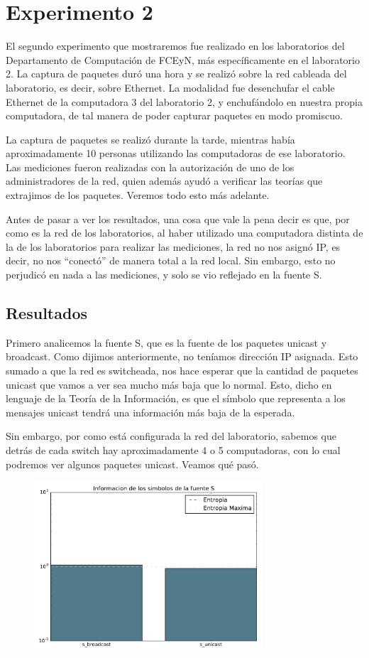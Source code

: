 \section{Experimento 2}

\PARstart El segundo experimento que mostraremos fue realizado en los laboratorios del Departamento de Computación de FCEyN, más específicamente en el laboratorio 2.
La captura de paquetes duró una hora y se realizó sobre la red cableada del laboratorio, es decir, sobre Ethernet.
La modalidad fue desenchufar el cable Ethernet de la computadora 3 del laboratorio 2, y enchufándolo en nuestra propia computadora, de tal manera de poder capturar paquetes en modo promiscuo.

La captura de paquetes se realizó durante la tarde, mientras había aproximadamente 10 personas utilizando las computadoras de ese laboratorio. Las mediciones fueron realizadas con la autorización de uno de los administradores de la red, quien además ayudó a verificar las teorías que extrajimos de los paquetes. Veremos todo esto más adelante.

Antes de pasar a ver los resultados, una cosa que vale la pena decir es que, por como es la red de los laboratorios, al haber utilizado una computadora distinta de la de los laboratorios para realizar las mediciones, la red no nos asignó IP, es decir, no nos ``conectó'' de manera total a la red local. Sin embargo, esto no perjudicó en nada a las mediciones, y solo se vio reflejado en la fuente S.


\subsection{Resultados}

Primero analicemos la fuente S, que es la fuente de los paquetes unicast y broadcast. Como dijimos anteriormente, no teníamos dirección IP asignada. Esto sumado a que la red es switcheada, nos hace esperar que la cantidad de paquetes unicast que vamos a ver sea mucho más baja que lo normal. Esto, dicho en lenguaje de la Teoría de la Información, es que el símbolo que representa a los mensajes unicast tendrá una información más baja de la esperada.

Sin embargo, por como está configurada la red del laboratorio, sabemos que detrás de cada switch hay aproximadamente 4 o 5 computadoras, con lo cual podremos ver algunos paquetes unicast. Veamos qu\'e pasó.

\begin{figure}[H]
  \centering
  \includegraphics[width=8.5cm]{exp_labo/grafico1.pdf}
  \caption{\normalfont }
\end{figure}


